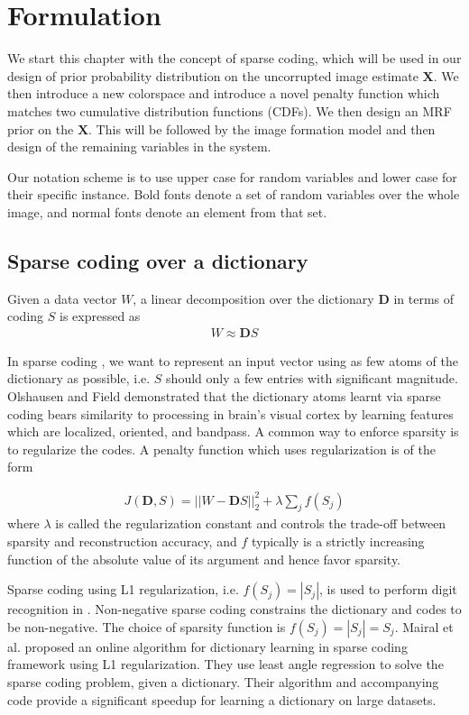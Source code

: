 \chapter{Formulation}

We start this chapter with the concept of sparse coding, which will be used in our design of prior probability distribution on the uncorrupted image estimate $\mathbf{X}$. We then introduce a new colorspace and introduce a novel penalty function which matches two cumulative distribution functions (CDFs). We then design an MRF prior on the $\mathbf{X}$. This will be followed by the image formation model and then design of the remaining variables in the system.

Our notation scheme is to use upper case for random variables and lower case for their specific instance. Bold fonts denote a set of random variables over the whole image, and normal fonts denote an element from that set.

\section{Sparse coding over a dictionary}
Given a data vector $W$, a linear decomposition over the dictionary $\mathbf{D}$ in terms of coding $S$ is expressed as
\begin{align}
    W \approx \mathbf{D} S \label{eqn:lineardecomp}
\end{align}

In sparse coding \cite{harpur1996sc}, we want to represent an input vector using as few atoms of the dictionary as possible, i.e. $S$ should only a few entries with significant magnitude. Olshausen and Field\cite{olshausen1996sparse} demonstrated that the dictionary atoms learnt via sparse coding bears similarity to processing in brain's visual cortex by learning features which are localized, oriented, and bandpass. A common way to enforce sparsity is to regularize the codes. A penalty function which uses regularization is of the form

\begin{align}
    J(\mathbf{D}, S) = || W - \mathbf{D} S ||_2^2 + \lambda \sum_{j} f(S_{j}) \label{eqn:sparsecoding}
\end{align}
where $\lambda$ is called the regularization constant and controls the trade-off between sparsity and reconstruction accuracy, and $f$ typically is a strictly increasing function of the absolute value of its argument and hence favor sparsity.

Sparse coding using L1 regularization, i.e. $f(S_{j}) = | S_{j} |$, is used to perform digit recognition in \cite{mairal2009supervised}. Non-negative sparse coding \cite{hoyer2002nnsc} constrains the dictionary and codes to be non-negative. The choice of sparsity function is $f(S_{j}) = | S_{j} | = S_{j}$. Mairal et al. \cite{mairal2009online} proposed an online algorithm for dictionary learning in sparse coding framework using L1 regularization. They use least angle regression to solve the sparse coding problem, given a dictionary. Their algorithm and accompanying code provide a significant speedup for learning a  dictionary on large datasets.

